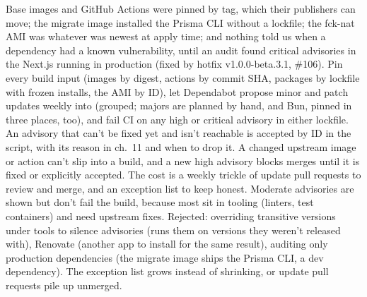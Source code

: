   {Base images and GitHub Actions were pinned by tag, which their publishers can move; the migrate
   image installed the Prisma CLI without a lockfile; the fck-nat AMI was whatever was newest at
   apply time; and nothing told us when a dependency had a known vulnerability, until an audit found
   critical advisories in the Next.js running in production (fixed by hotfix v1.0.0-beta.3.1, \#106).}
  {Pin every build input (images by digest, actions by commit SHA, packages by lockfile with frozen
   installs, the AMI by ID), let Dependabot propose minor and patch updates weekly into 
   (grouped; majors are planned by hand, and Bun, pinned in three places, too), and fail CI on any high or critical advisory in either lockfile.
   An advisory that can't be fixed yet and isn't reachable is accepted by ID in the 
   script, with its reason in ch.~11 and when to drop it.}
  {A changed upstream image or action can't slip into a build, and a new high advisory blocks merges
   until it is fixed or explicitly accepted. The cost is a weekly trickle of update pull requests to
   review and merge, and an exception list to keep honest. Moderate advisories are shown but don't
   fail the build, because most sit in tooling (linters, test containers) and need upstream fixes.
   Rejected: overriding transitive versions under tools to silence advisories (runs them on versions
   they weren't released with), Renovate (another app to install for the same result), auditing only
   production dependencies (the migrate image ships the Prisma CLI, a dev dependency).}
  {The exception list grows instead of shrinking, or update pull requests pile up unmerged.}

